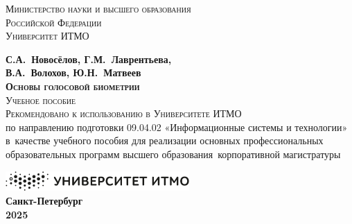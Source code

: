 \documentclass[crop=false]{standalone}
\begin{document}
\begin{center}

\thispagestyle{empty}
\newpage

\thispagestyle{empty}

\textsc{\large{Министерство науки и высшего образования \\ Российской Федерации}} \\[3ex]

\textsc{\large{Университет ИТМО}}

\vspace{7.8cm}

\textbf{\LARGE{С.А.~Новосёлов, Г.М.~Лаврентьева, \\ В.А.~Волохов, Ю.Н.~Матвеев}} \\ [3ex]

\textsc{\textbf{\LARGE{Основы голосовой биометрии}}} \\ [3ex]

\textsc{\large{Учебное пособие}} \\ [3ex]

\large{\textsc{Рекомендовано к использованию в Университете ИТМО} \\ по направлению подготовки 09.04.02 «Информационные системы и технологии» в~качестве учебного пособия для реализации основных профессиональных образовательных программ высшего образования~корпоративной магистратуры}

\vspace{7.8cm}

\includegraphics[width=7cm]{images/cover/logo_bw.png} \\ [2ex]

\textbf{\large{Санкт-Петербург}} \\ [2ex]
\textbf{\large{2025}}

\end{center}
\end{document}
